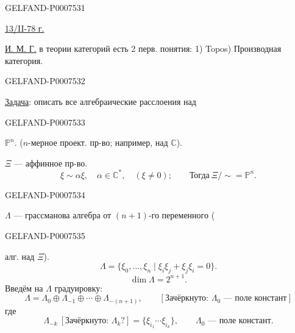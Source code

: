 \begin{GelfandAdjacentEvidence}{GELFAND-P000753}{1}

\underline{13/II-78 г.}\qquad {}

\underline{И. М. Г.} в теории категорий есть 2 перв. понятия:
1) Topos) Производная категория.

\end{GelfandAdjacentEvidence}
\begin{GelfandAdjacentEvidence}{GELFAND-P000753}{2}


\underline{Задача}: описать все алгебраические расслоения над
\end{GelfandAdjacentEvidence}
\begin{GelfandAdjacentEvidence}{GELFAND-P000753}{3}

\(\mathbb P^n\).
(\(n\)-мерное проект. пр-во; например, над \(\mathbb C\)).

\(\Xi\) --- аффинное пр-во.
\[
\xi\sim\alpha\xi,\quad \alpha\in\mathbb C^*,\quad (\xi\ne0);
\qquad \text{Тогда}\ \Xi/{\sim}=\mathbb P^n.
\]
\end{GelfandAdjacentEvidence}
\begin{GelfandAdjacentEvidence}{GELFAND-P000753}{4}


\(\Lambda\) --- грассманова алгебра от \((n+1)\)-го переменного
(
\end{GelfandAdjacentEvidence}
\begin{GelfandAdjacentEvidence}{GELFAND-P000753}{5}

алг. над \(\Xi\)).
\[
\Lambda=\{\xi_0,\ldots,\xi_n\mid
\xi_i\xi_j+\xi_j\xi_i=0\}.
\]
\[
\dim\Lambda=2^{n+1}.
\]
Введём на \(\Lambda\) градуировку:
\begin{equation*}
\Lambda=\Lambda_0\oplus\Lambda_{-1}\oplus\cdots\oplus\Lambda_{-(n+1)},
\qquad [\text{Зачёркнуто: }\Lambda_0\text{ --- поле констант}]
\tag{1}
\end{equation*}
где
\[
\Lambda_{-k}\ [\text{Зачёркнуто: }\Lambda_k?]
=\{\xi_{i_1}\cdots\xi_{i_k}\},\qquad
\Lambda_0\text{ --- поле констант}.
\]
\end{GelfandAdjacentEvidence}
